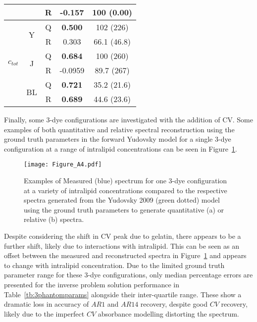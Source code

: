 \begin{table}[htbp]
\begin{tabular}{|ccc|cc|}
        & & R & -0.157 & 100 (0.00) \\
        \hline
        \multirow{6}{*}{$c_{tot}$} & \multirow{2}{*}{Y} & Q &  \textbf{0.500} & 102 (226) \\
        & & R & 0.303 & 66.1 (46.8) \\
        \cline{2-5}
        & \multirow{2}{*}{J} & Q & \textbf{0.684} & 100 (260) \\
        & & R & -0.0959 & 89.7 (267)\\
        \cline{2-5}
        & \multirow{2}{*}{BL} & Q & \textbf{0.721} & 35.2 (21.6) \\
        & & R & \textbf{0.689} & 44.6 (23.6)\\
        \hline
    \end{tabular}
    \label{tb:phantomparams}
\end{table}

Finally, some 3-dye configurations are investigated with the addition of CV. Some examples of both quantitative and relative spectral reconstruction using the ground truth parameters in the forward Yudovsky model for a single 3-dye configuration at a range of intralipid concentrations can be seen in Figure~\ref{ap:3phantomforwards}. 

\begin{figure}[htb!]
    \centering
    \texttt{[image: Figure\_A4.pdf]}
    \caption{Examples of Measured (blue) spectrum for one 3-dye configuration at a variety of intralipid concentrations compared to the respective spectra generated from the Yudovsky 2009 (green dotted) model using the ground truth parameters to generate quantitative (a) or relative (b) spectra.}
 \label{ap:3phantomforwards}
\end{figure}

Despite considering the shift in CV peak due to gelatin, there appears to be a further shift, likely due to interactions with intralipid. This can be seen as an offset between the measured and reconstructed spectra in Figure~\ref{ap:3phantomforwards} and appears to change with intralipid concentration. Due to the limited ground truth parameter range for these 3-dye configurations, only median percentage errors are presented for the inverse problem solution performance in Table~\ref{tb:3phantomparams} alongside their inter-quartile range. These show a dramatic loss in accuracy of $AR1$ and $AR14$ recovery, despite good $CV$ recovery, likely due to the imperfect $CV$ absorbance modelling distorting the spectrum. 

